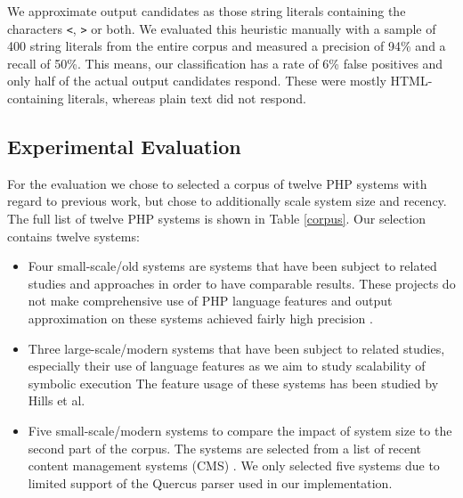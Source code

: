 \documentclass{sig-alternate-05-2015}
\begin{document}
We approximate output candidates as those string literals containing the
characters \texttt{<}, \texttt{>} or both. We evaluated this heuristic manually
with a sample of 400 string literals from the entire corpus and measured a
precision of 94\% and a recall of 50\%. This means, our classification has a
rate of 6\% false positives and only half of the actual output candidates
respond. These were mostly HTML-containing literals, whereas plain text did not
respond. 

\subsection{Experimental Evaluation} 
For the evaluation we chose to selected a corpus of twelve PHP systems with regard to
previous work, but chose to additionally scale system size and recency. The full list of twelve PHP systems is shown in Table \ref{corpus}. Our selection contains
twelve systems:

\begin{itemize}
  \item Four small-scale/old systems are systems that have been subject to
  related studies and approaches in order to have comparable results. These
  projects do not make comprehensive use of PHP language features and output
  approximation on these systems achieved fairly high precision
  \cite{minamide2005static,Nguyen:2014:BCG:2635868.2635928}.
  
  \item Three large-scale/modern systems that have been subject to related
  studies, especially their use of language features as we aim to study
  scalability of symbolic execution The feature usage of these systems has been
  studied by Hills et al. \cite{Hills:2013:ESP:2483760.2483786}
  
  \item Five small-scale/modern systems to compare the impact
  of system size to the second part of the corpus. The systems are selected
  from a list of recent content management systems (CMS) \cite{codegeekz}. We only selected five systems 	due to limited support of the Quercus parser used in our implementation.
\end{itemize}
\end{document}
